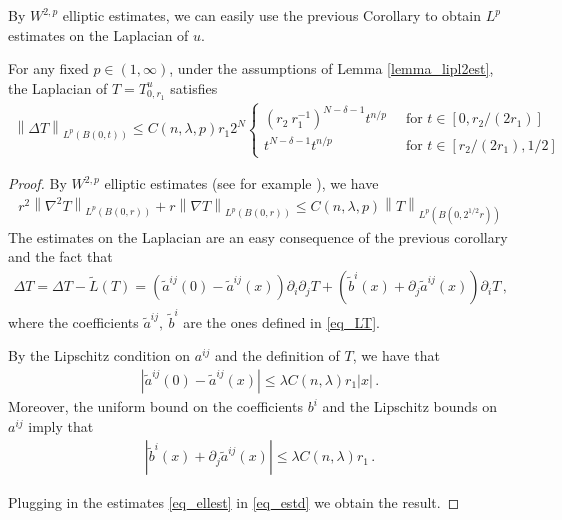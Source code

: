 \documentclass[11pt]{article}
\begin{document}
By $W^{2,p}$ elliptic estimates, we can easily use the previous Corollary to obtain $L^p$ estimates on the Laplacian of $u$.
\begin{lemma}\label{lemma_liplpest}
 For any fixed $p\in (1,\infty)$, under the assumptions of Lemma \ref{lemma_lipl2est}, the Laplacian of $T=T^u_{0,r_1}$ satisfies
 \begin{gather}\label{eq_lipdeltaest}
  {\left\|{\Delta T}\right\|}_{L^p(B(0,t))}\leq C(n,\lambda,p)r_1 2^{N} \begin{cases}
				 {\left({r_2\ r_1^{-1}}\right)}^{N-\delta-1} t^{n/p}\   & \text{ for } t \in [0,r_2/(2r_1)]\\
				 t^{N-\delta-1} t^{n/p} & \text{ for } t \in [r_2/(2r_1),1/2]
				\end{cases}
 \end{gather}
\end{lemma}
\begin{proof}
 By $W^{2,p}$ elliptic estimates (see for example \cite[theorem 9.11]{GT}), we have
 \begin{gather}\label{eq_ellest}
  r^{2} {\left\|{\nabla^{2} T }\right\|}_{L^p(B(0,r))} + r {\left\|{\nabla T }\right\|}_{L^p(B(0,r))} \leq C(n,\lambda,p) {\left\|{T }\right\|}_{L^p(B(0,2^{1/2}r))}
 \end{gather}
The estimates on the Laplacian are an easy consequence of the previous corollary and the fact that
 \begin{gather}\label{eq_estd}
  \Delta T = \Delta T - \tilde L(T) = {\left({\tilde a^{ij}(0)-\tilde a^{ij}(x)}\right)}\partial_i \partial_j T + {\left({\tilde b^i(x) + \partial _j \tilde a^{ij}(x)}\right)} \partial_i T\, ,
 \end{gather}
where the coefficients $\tilde a^{ij}, \ \tilde b^i$ are the ones defined in \eqref{eq_LT}.
 
By the Lipschitz condition on $a^{ij}$ and the definition of $T$, we have that
\begin{gather}
 {\left|{\tilde a^{ij}(0)-\tilde a^{ij}(x)}\right|}\leq  \lambda C(n,\lambda) r_1 {\left|x\right|}\, .
\end{gather}
Moreover, the uniform bound on the coefficients $b^i$ and the Lipschitz bounds on $a^{ij}$ imply that
\begin{gather}
 {\left|{\tilde b^i(x) + \partial _j \tilde a^{ij}(x) }\right|} \leq \lambda C(n,\lambda) r_1\, .
\end{gather}

Plugging in the estimates \eqref{eq_ellest} in \eqref{eq_estd} we obtain the result.
 
\end{proof}
\end{document}
